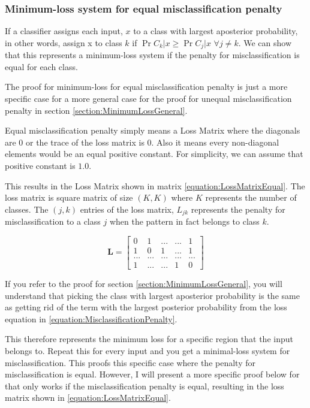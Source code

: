 \documentclass[a4paper,12pt]{article}
\begin{document}
\subsubsection{Minimum-loss system for equal misclassification penalty}
If a classifier assigns each input, $x$ to a class with largest aposterior probability,
in other words, assign x to class $k$ if $\Pr{C_{k}|x} \ge \Pr{C_{j}|x}$ $\forall j \neq k$. 
We can show that this represents a minimum-loss system if the penalty for misclassification is equal for each class. 

The proof for minimum-loss for equal misclassification penalty is just a more specific case for a more general case for the proof for unequal misclassification penalty in section \ref{section:MinimumLossGeneral}. 

Equal misclassification penalty simply means a Loss Matrix where the diagonals are 0 or the trace of the loss matrix is 0. Also it means every non-diagonal elements would be an equal positive constant. For simplicity, we can assume that positive constant is $1.0$. 

This results in the Loss Matrix shown in matrix \ref{equation:LossMatrixEqual}. The loss matrix is square matrix of size $(K,K)$ where $K$ represents the number of classes. 
The $(j,k)$ entries of the loss matrix, $L_{jk}$ represents the penalty for misclassification to a class $j$ when the pattern in fact belongs to class $k$. 

\begin{equation}
\label{equation:LossMatrixEqual}
\mathbf{L} =
  \begin{bmatrix}
    0 & 1 & ... & ... & 1 \\
    1 & 0 & 1 & ... & 1 \\
    ... & ... & ... & ... & ... \\
    1 & ... & ... & 1 & 0
  \end{bmatrix}
\end{equation}

If you refer to the proof for section \ref{section:MinimumLossGeneral}, you will understand that picking the  class with largest aposterior probability is the same as getting rid of the term with the largest posterior probability from the loss equation in \ref{equation:MisclassificationPenalty}.

This therefore represents the minimum loss for a specific region that the input belongs to. Repeat this for every input and you get a minimal-loss system for misclassification. This proofs this specific case where the penalty for misclassification is equal. However, I will present a more specific proof below for that only works if the misclassification penalty is equal, resulting in the loss matrix shown in \ref{equation:LossMatrixEqual}. 
\end{document}

